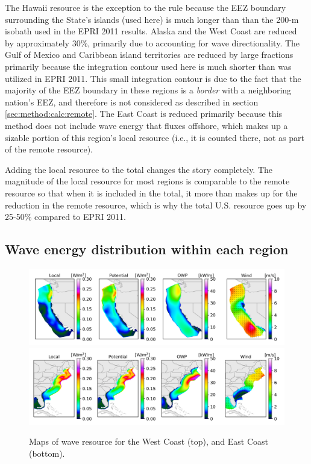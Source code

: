 The Hawaii resource is the exception to the rule because the EEZ boundary surrounding the State's islands (used here) is much longer than than the 200-m isobath used in the EPRI 2011 results.
Alaska and the West Coast are reduced by approximately 30\%, primarily due to accounting for wave directionality.
The Gulf of Mexico and Caribbean island territories are reduced by large fractions primarily because the integration contour used here is much shorter than was utilized in EPRI 2011. This small integration contour is due to the fact that the majority of the EEZ boundary in these regions is a {\it border} with a neighboring nation's EEZ, and therefore is not considered as described in section \ref{sec:method:calc:remote}.
The East Coast is reduced primarily because this method does not include wave energy that fluxes offshore, which makes up a sizable portion of this region's local resource (i.e., it is counted there, not as part of the remote resource).

Adding the local resource to the total changes the story completely. The magnitude of the local resource for most regions is comparable to the remote resource so that when it is included in the total, it more than makes up for the reduction in the remote resource, which is why the total U.S. resource goes up by 25-50\% compared to EPRI 2011.


\subsection{Wave energy distribution within each region}

\begin{figure}[ht]
  \centering
  \includegraphics[width=\textwidth]{../fig/WC-Map01-November.png}
  \includegraphics[width=\textwidth]{../fig/EC-Map01-November.png}
  \caption{Maps of wave resource for the West Coast (top), and East Coast (bottom). }
  \label{fig:maps}
\end{figure}

